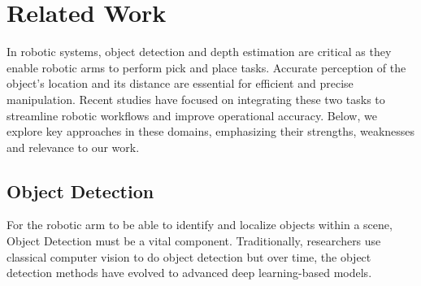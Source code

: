 \section{Related Work}
In robotic systems, object detection and depth estimation are critical as they enable robotic arms to perform pick and place tasks. Accurate perception of the object’s location and its distance are essential for efficient and precise manipulation. Recent studies have focused on integrating these two tasks to streamline robotic workflows and improve operational accuracy. 
Below, we explore key approaches in these domains, emphasizing their strengths, weaknesses and relevance to our work.

\subsection{Object Detection}
For the robotic arm to be able to identify and localize objects within a scene, Object Detection must be a vital component. Traditionally, researchers use classical computer vision to do object detection but over time, the object detection methods have evolved to advanced deep learning-based models.

